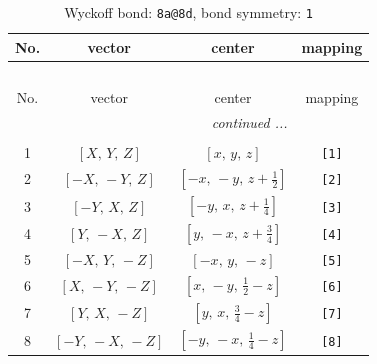 \documentclass[fleqn,8pt]{jsarticle}
\begin{document}
\begin{longtable}{cccc}
\caption{Wyckoff bond: {\tt 8a@8d}, bond symmetry: {\tt 1}}
 \\
 \hline \hline
No. & vector & center & mapping \\ \hline \endfirsthead

\multicolumn{3}{l}{\tablename\ \thetable{}} \\
 \hline \hline
No. & vector & center & mapping \\ \hline \endhead

 \hline \hline
\multicolumn{3}{r}{\footnotesize\it continued ...} \\ \endfoot

 \hline \hline
\multicolumn{3}{r}{} \\ \endlastfoot

1 & $\left[ X,\, Y,\, Z \right]$ & $\left[ x,\, y,\, z \right]$ & {\tt [1]} \\ \hline
2 & $\left[ - X,\, - Y,\, Z \right]$ & $\left[ - x,\, - y,\, z + \frac{1}{2} \right]$ & {\tt [2]} \\ \hline
3 & $\left[ - Y,\, X,\, Z \right]$ & $\left[ - y,\, x,\, z + \frac{1}{4} \right]$ & {\tt [3]} \\ \hline
4 & $\left[ Y,\, - X,\, Z \right]$ & $\left[ y,\, - x,\, z + \frac{3}{4} \right]$ & {\tt [4]} \\ \hline
5 & $\left[ - X,\, Y,\, - Z \right]$ & $\left[ - x,\, y,\, - z \right]$ & {\tt [5]} \\ \hline
6 & $\left[ X,\, - Y,\, - Z \right]$ & $\left[ x,\, - y,\, \frac{1}{2} - z \right]$ & {\tt [6]} \\ \hline
7 & $\left[ Y,\, X,\, - Z \right]$ & $\left[ y,\, x,\, \frac{3}{4} - z \right]$ & {\tt [7]} \\ \hline
8 & $\left[ - Y,\, - X,\, - Z \right]$ & $\left[ - y,\, - x,\, \frac{1}{4} - z \right]$ & {\tt [8]} \\
\end{longtable}
\end{document}
